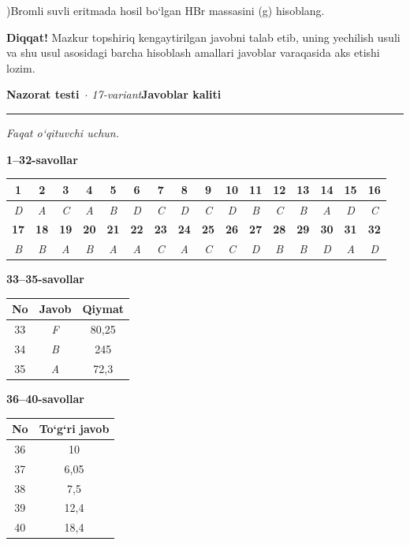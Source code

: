 \documentclass[11pt,a4paper]{article}
\newcommand{\diqqat}[1]{\par\smallskip\noindent\textbf{Diqqat!} #1\par\medskip}
\begin{document}
)Bromli suvli eritmada hosil bo`lgan HBr massasini (g) hisoblang.\par
\diqqat{Mazkur topshiriq kengaytirilgan javobni talab etib, uning yechilish usuli va shu usul asosidagi barcha hisoblash amallari javoblar varaqasida aks etishi lozim.}
\newpage
\noindent\textbf{\fontsize{13}{15}\selectfont Nazorat testi}\ \textit{$\cdot$ 17-variant}\hfill \textbf{Javoblar kaliti}\par\smallskip\hrule\smallskip
\textit{Faqat o`qituvchi uchun.}\par\medskip
\noindent\textbf{1--32-savollar}\par\smallskip
\noindent\begin{tabular}{|c|c|c|c|c|c|c|c|c|c|c|c|c|c|c|c|}\hline
\textbf{1} & \textbf{2} & \textbf{3} & \textbf{4} & \textbf{5} & \textbf{6} & \textbf{7} & \textbf{8} & \textbf{9} & \textbf{10} & \textbf{11} & \textbf{12} & \textbf{13} & \textbf{14} & \textbf{15} & \textbf{16}\\\hline
\textsl{D} & \textsl{A} & \textsl{C} & \textsl{A} & \textsl{B} & \textsl{D} & \textsl{C} & \textsl{D} & \textsl{C} & \textsl{D} & \textsl{B} & \textsl{C} & \textsl{B} & \textsl{A} & \textsl{D} & \textsl{C}\\\hline
\textbf{17} & \textbf{18} & \textbf{19} & \textbf{20} & \textbf{21} & \textbf{22} & \textbf{23} & \textbf{24} & \textbf{25} & \textbf{26} & \textbf{27} & \textbf{28} & \textbf{29} & \textbf{30} & \textbf{31} & \textbf{32}\\\hline
\textsl{B} & \textsl{B} & \textsl{A} & \textsl{B} & \textsl{A} & \textsl{A} & \textsl{C} & \textsl{A} & \textsl{C} & \textsl{C} & \textsl{D} & \textsl{B} & \textsl{B} & \textsl{D} & \textsl{A} & \textsl{D}\\\hline
\end{tabular}\par\medskip
\noindent\textbf{33--35-savollar}\par\smallskip
\noindent\begin{tabular}{|c|c|c|}\hline \textbf{No} & \textbf{Javob} & \textbf{Qiymat}\\\hline
33 & \textsl{F} & 80,25\\\hline
34 & \textsl{B} & 245\\\hline
35 & \textsl{A} & 72,3\\\hline
\end{tabular}\par\medskip
\noindent\textbf{36--40-savollar}\par\smallskip
\noindent\begin{tabular}{|c|c|}\hline \textbf{No} & \textbf{To`g`ri javob}\\\hline
36 & 10\\\hline
37 & 6,05\\\hline
38 & 7,5\\\hline
39 & 12,4\\\hline
40 & 18,4\\\hline
\end{tabular}\par\medskip
\end{document}
